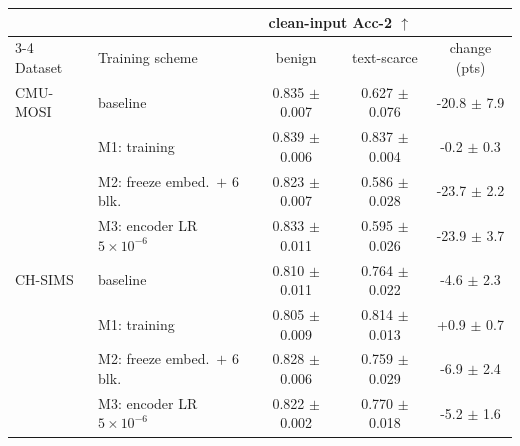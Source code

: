 
\begin{tabular}{llccc}
\toprule
 & & \multicolumn{2}{c}{clean-input Acc-2 $\uparrow$} & \\
\cmidrule(lr){3-4}
Dataset & Training scheme & benign & text-scarce & change (pts) \\
\midrule
CMU-MOSI & \tokenlevel{} baseline & 0.835 $\pm$ 0.007 & 0.627 $\pm$ 0.076 & -20.8 $\pm$ 7.9 \\
 & M1: \modlevel{} training & 0.839 $\pm$ 0.006 & 0.837 $\pm$ 0.004 & -0.2 $\pm$ 0.3 \\
 & M2: freeze embed.\ $+$ 6 blk. & 0.823 $\pm$ 0.007 & 0.586 $\pm$ 0.028 & -23.7 $\pm$ 2.2 \\
 & M3: encoder LR $5\times10^{-6}$ & 0.833 $\pm$ 0.011 & 0.595 $\pm$ 0.026 & -23.9 $\pm$ 3.7 \\
\addlinespace
CH-SIMS & \tokenlevel{} baseline & 0.810 $\pm$ 0.011 & 0.764 $\pm$ 0.022 & -4.6 $\pm$ 2.3 \\
 & M1: \modlevel{} training & 0.805 $\pm$ 0.009 & 0.814 $\pm$ 0.013 & +0.9 $\pm$ 0.7 \\
 & M2: freeze embed.\ $+$ 6 blk. & 0.828 $\pm$ 0.006 & 0.759 $\pm$ 0.029 & -6.9 $\pm$ 2.4 \\
 & M3: encoder LR $5\times10^{-6}$ & 0.822 $\pm$ 0.002 & 0.770 $\pm$ 0.018 & -5.2 $\pm$ 1.6 \\
\bottomrule
\end{tabular}

